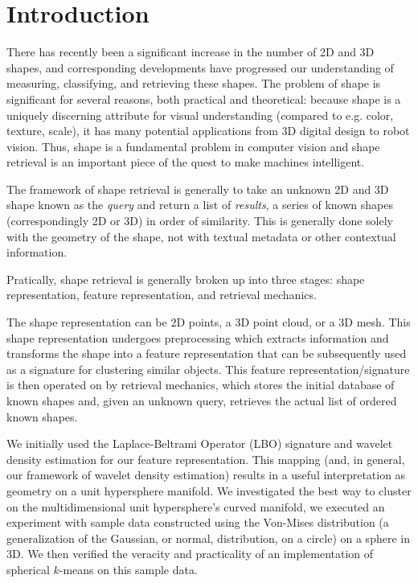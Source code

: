 \documentclass[../tech_report_1.tex]{subfiles}
\begin{document}
\section{Introduction}

There has recently been a significant increase in the number of 2D and 3D shapes, and corresponding developments have progressed our understanding of measuring, classifying, and retrieving these shapes. The problem of shape is significant for several reasons, both practical and theoretical: because shape is a uniquely discerning attribute for visual understanding (compared to e.g. color, texture, scale), it has many potential applications from 3D digital design to robot vision. Thus, shape is a fundamental problem in computer vision and shape retrieval is an important piece of the quest to make machines intelligent.

The framework of shape retrieval is generally to take an unknown 2D and 3D shape known as the \textit{query} and return a list of \textit{results}, a series of known shapes (correspondingly 2D or 3D) in order of similarity. This is generally done solely with the geometry of the shape, not with textual metadata or other contextual information.

Pratically, shape retrieval is generally broken up into three stages:
shape representation, feature representation, and retrieval mechanics.

The shape representation can be 2D points, a 3D point cloud, or a 3D mesh. This shape representation undergoes preprocessing which extracts information and transforms the shape into a feature representation that can be subsequently used as a signature for clustering similar objects. This feature representation/signature is then operated on by retrieval mechanics, which stores the initial database of known shapes and, given an unknown query, retrieves the actual list of ordered known shapes.

We initially used the Laplace-Beltrami Operator (LBO) signature and wavelet density estimation for our feature representation. This mapping (and, in general, our framework of wavelet density estimation) results in a useful interpretation as geometry on a unit hypersphere manifold. We investigated the best way to cluster on the multidimensional unit hypersphere's curved manifold, we executed an experiment with sample data constructed using the Von-Mises distribution (a generalization of the Gaussian, or normal, distribution, on a circle) on a sphere in 3D. We then verified the veracity and practicality of an implementation of spherical $k$-means on this sample data.
\end{document}
